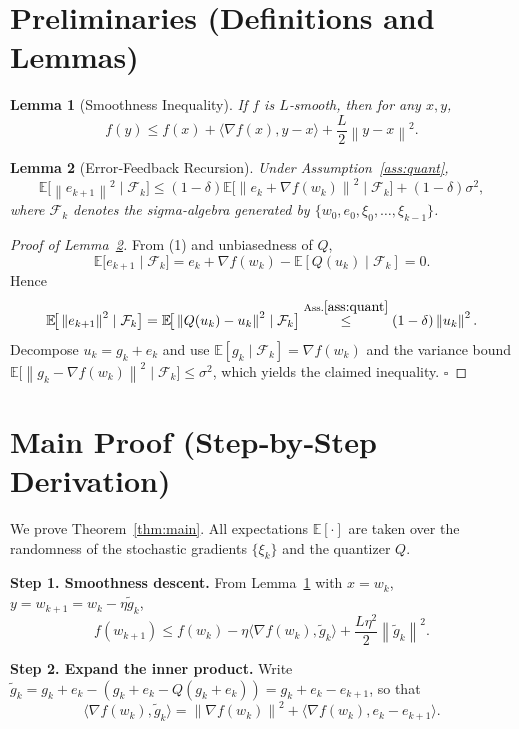 \documentclass{article}
\newtheorem{lemma}{Lemma}
\newcommand{\E}{\mathbb{E}}
\newcommand{\norm}[1]{\left\|#1\right\|}
\newcommand{\ip}[2]{\langle #1,#2\rangle}
\begin{document}
\section*{Preliminaries (Definitions and Lemmas)}
\begin{lemma}[Smoothness Inequality]\label{lem:smooth}
If $f$ is $L$‑smooth, then for any $x,y$,
\[
f(y)\le f(x)+\ip{\nabla f(x)}{y-x}+\frac{L}{2}\norm{y-x}^2 .
\]
\end{lemma}
\begin{lemma}[Error‑Feedback Recursion]\label{lem:error}
Under Assumption~\ref{ass:quant},
\[
\E\!\big[\norm{e_{k+1}}^2\mid\mathcal{F}_k\big]
\le (1-\delta)\E\!\big[\norm{e_k+\nabla f(w_k)}^2\mid\mathcal{F}_k\big]
    + (1-\delta)\sigma^2 ,
\]
where $\mathcal{F}_k$ denotes the sigma‑algebra generated by
$\{w_0,e_0,\xi_0,\dots,\xi_{k-1}\}$.
\end{lemma}
\begin{proof}[Proof of Lemma~\ref{lem:error}]
From (1) and unbiasedness of $Q$,
\[
\E\!\big[e_{k+1}\mid\mathcal{F}_k\big]=e_k+\nabla f(w_k)-\E[Q(u_k)\mid\mathcal{F}_k]=0 .
\]
Hence
\[
\E\!\big[\norm{e_{k+1}}^2\mid\mathcal{F}_k\big]
 = \E\!\big[\norm{Q(u_k)-u_k}^2\mid\mathcal{F}_k\big]
 \stackrel{\text{Ass.}\ref{ass:quant}}{\le}
 (1-\delta)\norm{u_k}^2 .
\]
Decompose $u_k=g_k+e_k$ and use $\E[g_k\mid\mathcal{F}_k]=\nabla f(w_k)$ and the
variance bound $\E\!\big[\norm{g_k-\nabla f(w_k)}^2\mid\mathcal{F}_k\big]\le\sigma^2$,
which yields the claimed inequality. \hfill$\square$
\end{proof}

\newpage

\section*{Main Proof (Step‑by‑Step Derivation)}
We prove Theorem~\ref{thm:main}.  
All expectations $\E[\cdot]$ are taken over the randomness of the
stochastic gradients $\{\xi_k\}$ and the quantizer $Q$.

\noindent\textbf{Step 1. Smoothness descent.}  
From Lemma~\ref{lem:smooth} with $x=w_k$, $y=w_{k+1}=w_k-\eta\tilde g_k$,
\[
f(w_{k+1})\le f(w_k)-\eta\ip{\nabla f(w_k)}{\tilde g_k}
               +\frac{L\eta^{2}}{2}\norm{\tilde g_k}^{2}. \tag{4}
\]

\noindent\textbf{Step 2. Expand the inner product.}  
Write $\tilde g_k = g_k+e_k-(g_k+e_k-Q(g_k+e_k)) = g_k+e_k-e_{k+1}$,
so that
\[
\ip{\nabla f(w_k)}{\tilde g_k}
 = \norm{\nabla f(w_k)}^{2}
   +\ip{\nabla f(w_k)}{e_k-e_{k+1}} . \tag{5}
\]
\end{document}
